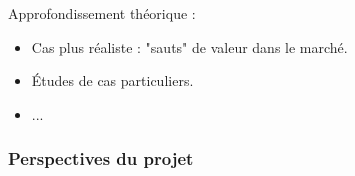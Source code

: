 \documentclass[french]{beamer}
\begin{document}
\begin{frame}
Approfondissement théorique : 
\begin{itemize}
	\item Cas plus réaliste : "sauts" de valeur dans le marché.
	\item Études de cas particuliers.
	\item ...
\end{itemize}
\frametitle{Perspectives du projet}
\end{frame}

\begin{frame}
\end{frame} %
\end{document}
